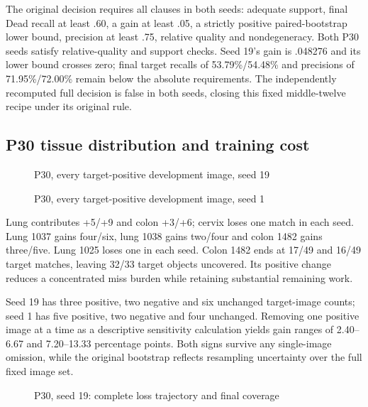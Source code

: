 \documentclass[
  11pt,
]{article}
\begin{document}
The original decision requires all clauses in both seeds: adequate
support, final Dead recall at least .60, a gain at least .05, a strictly
positive paired-bootstrap lower bound, precision at least .75, relative
quality and nondegeneracy. Both P30 seeds satisfy relative-quality and
support checks. Seed 19's gain is .048276 and its lower bound crosses
zero; final target recalls of 53.79\%/54.48\% and precisions of
71.95\%/72.00\% remain below the absolute requirements. The
independently recomputed full decision is false in both seeds, closing
this fixed middle-twelve recipe under its original rule.

\subsection{P30 tissue distribution and training
cost}\label{p30-tissue-distribution-and-training-cost}

\begin{figure}[H]\centering

\caption{P30, every target-positive development image, seed 19}
\end{figure}

\begin{figure}[H]\centering

\caption{P30, every target-positive development image, seed 1}
\end{figure}

Lung contributes +5/+9 and colon +3/+6; cervix loses one match in each
seed. Lung 1037 gains four/six, lung 1038 gains two/four and colon 1482
gains three/five. Lung 1025 loses one in each seed. Colon 1482 ends at
17/49 and 16/49 target matches, leaving 32/33 target objects uncovered.
Its positive change reduces a concentrated miss burden while retaining
substantial remaining work.

Seed 19 has three positive, two negative and six unchanged target-image
counts; seed 1 has five positive, two negative and four unchanged.
Removing one positive image at a time as a descriptive sensitivity
calculation yields gain ranges of 2.40--6.67 and 7.20--13.33 percentage
points. Both signs survive any single-image omission, while the original
bootstrap reflects resampling uncertainty over the full fixed image set.

\begin{figure}[H]\centering

\caption{P30, seed 19: complete loss trajectory and final coverage}
\end{figure}
\end{document}
